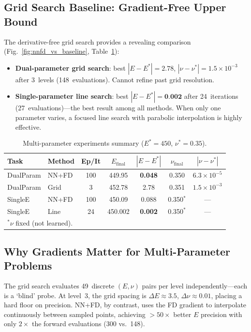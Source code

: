 \documentclass{article}
\begin{document}
\subsection{Grid Search Baseline: Gradient-Free Upper Bound}

The derivative-free grid search provides a revealing comparison
(Fig.~\ref{fig:nnfd_vs_baseline}, Table~\ref{tab:multiparam}):

\begin{itemize}[itemsep=1pt]
\item \textbf{Dual-parameter grid search}: best $|E-E^*|=2.78$,
  $|\nu-\nu^*|=1.5\times10^{-3}$ after 3~levels (148~evaluations).
  Cannot refine past grid resolution.
\item \textbf{Single-parameter line search}: best $|E-E^*|=\textbf{0.002}$
  after 24~iterations (27~evaluations)---the best result among all
  methods.  When only one parameter varies, a focused line search with
  parabolic interpolation is highly effective.
\end{itemize}

\begin{table}[H]
\centering
\caption{Multi-parameter experiments summary ($E^*=450$, $\nu^*=0.35$).}
\label{tab:multiparam}
\begin{tabular}{llccccc}
\toprule
Task & Method & Ep/It & $E_{\text{final}}$ & $|E-E^*|$ & $\nu_{\text{final}}$ & $|\nu-\nu^*|$ \\
\midrule
DualParam & NN+FD & 100 & 449.95 & \textbf{0.048} & 0.350 & \textbf{$6.3\times10^{-5}$} \\
DualParam & Grid & 3 & 452.78 & 2.78 & 0.351 & $1.5\times10^{-3}$ \\
SingleE & NN+FD & 100 & 450.09 & 0.088 & 0.350$^*$ & --- \\
SingleE & Line & 24 & 450.002 & \textbf{0.002} & 0.350$^*$ & --- \\
\midrule
\multicolumn{7}{l}{\footnotesize $^*$$\nu$ fixed (not learned).}
\end{tabular}
\end{table}

\subsection{Why Gradients Matter for Multi-Parameter Problems}

The grid search evaluates 49~discrete $(E,\nu)$ pairs per level
independently---each is a `blind' probe.  At level~3, the grid spacing
is $\Delta E\approx3.5$, $\Delta\nu\approx0.01$, placing a hard floor on
precision.  NN+FD, by contrast, uses the FD gradient to interpolate
continuously between sampled points, achieving $>50\times$ better $E$
precision with only $2\times$ the forward evaluations (300 vs.\ 148).
\end{document}
